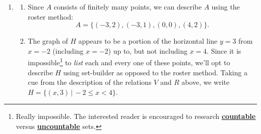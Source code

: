\documentclass{ximera}
\begin{document}
\begin{example}
\begin{explanation}
\begin{enumerate}
\begin{enumerate}
\begin{image}

\end{image}

\end{enumerate}

\item  \begin{enumerate}

\item  Since $A$ consists of finitely many points, we can describe $A$ using the roster method:  \[A = \{ (-3,2), (-3,1), (0,0), (4,2) \}.\]

\item  The graph of $H$ appears to be a portion of the horizontal line $y=3$ from $x = -2$ (including $x = -2$) up to, but not including $x=4$.  Since it is impossible\footnote{Really impossible.  The interested reader is encouraged to research \href{http://en.wikipedia.org/wiki/Countable_set}{\underline{\textbf{countable}}} versus \href{http://en.wikipedia.org/wiki/Uncountable_set}{\underline{\textbf{uncountable}}} sets.}  to \textit{list} each and every one of these points, we'll opt to describe $H$ using set-builder as opposed to the roster method.  Taking a cue from the description of the relations $V$ and $R$ above, we write  $H = \{ (x, 3) \, | \, -2 \leq x < 4 \}$.


\end{enumerate}
\end{enumerate}
\end{explanation}
\end{example}
\end{document}
